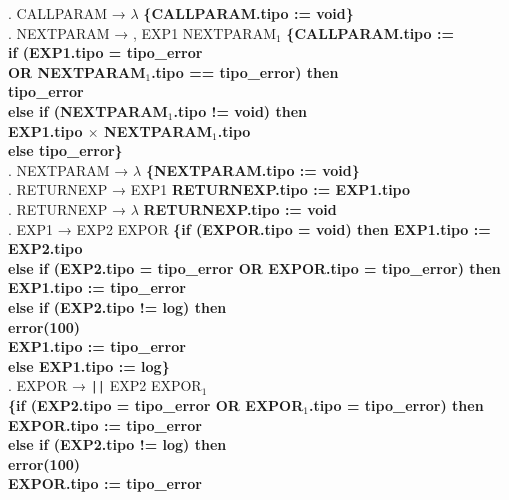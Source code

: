 \begin{tabbing}
    . CALLPARAM → $\lambda$ \textbf{\{CALLPARAM.tipo := void\}}\\
    . NEXTPARAM → , EXP1 NEXTPARAM$_1$ \textbf{\{CALLPARAM.tipo :=}\\
    \>              \> \textbf{if (EXP1.tipo = tipo\_error}\\
    \>              \> \textbf{OR NEXTPARAM$_1$.tipo == tipo\_error) then}\\
    \>              \>          \> \textbf{tipo\_error}\\
    \>              \> \textbf{else if (NEXTPARAM$_1$.tipo != void) then}\\
    \>              \>          \>\textbf{EXP1.tipo $\times$ NEXTPARAM$_1$.tipo}\\
    \>              \> \textbf{else tipo\_error\}}\\
    . NEXTPARAM → $\lambda$ \textbf{\{NEXTPARAM.tipo := void\}}\\
    . RETURNEXP → EXP1 \textbf{RETURNEXP.tipo := EXP1.tipo}\\
    . RETURNEXP → $\lambda$ \textbf{RETURNEXP.tipo := void}\\
    . EXP1 → EXP2 EXPOR \textbf{\{if (EXPOR.tipo = void) then EXP1.tipo := EXP2.tipo}\\
    \>              \> \textbf{else if (EXP2.tipo = tipo\_error OR EXPOR.tipo = tipo\_error) then}\\
    \>              \>          \> \textbf{EXP1.tipo := tipo\_error}\\
    \>              \> \textbf{else if (EXP2.tipo != log) then}\\
    \>              \>          \> \textbf{error(100)}\\
    \>              \>          \> \textbf{EXP1.tipo := tipo\_error}\\
    \>              \> \textbf{else EXP1.tipo := log\}}\\
    . EXPOR → \verb!||! EXP2 EXPOR$_1$\\
    \>              \>\textbf{\{if (EXP2.tipo = tipo\_error OR EXPOR$_1$.tipo = tipo\_error) then}\\
    \>              \>          \> \textbf{EXPOR.tipo := tipo\_error}\\
    \>              \>\textbf{ else if (EXP2.tipo != log) then}\\
    \>              \>          \> \textbf{error(100)}\\
    \>              \>          \> \textbf{EXPOR.tipo := tipo\_error}\\

\end{tabbing}
